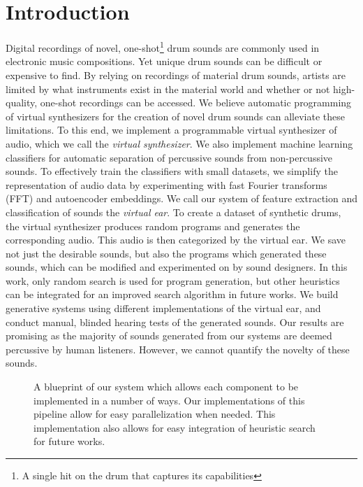 \documentclass[runningheads,a4paper]{llncs}
\begin{document}
\section{Introduction} 
Digital recordings of novel, one-shot\footnote{A single hit on the drum that captures its capabilities} drum sounds are commonly used in  electronic music compositions. Yet unique drum sounds can be difficult or expensive to find. By relying on recordings of material drum sounds, artists are limited by what instruments exist in the material world and whether or not high-quality, one-shot recordings can be accessed. We believe automatic programming of virtual synthesizers for the creation of novel drum sounds can alleviate these limitations. To this end, we implement a programmable virtual synthesizer of audio, which we call the \emph{virtual synthesizer}. We also implement machine learning classifiers for automatic separation of percussive sounds from non-percussive sounds. To effectively train the classifiers with small datasets, we simplify the representation of audio data by experimenting with fast Fourier transforms (FFT) and autoencoder embeddings. We call our system of feature extraction and classification of sounds the \emph{virtual ear}. To create a dataset of synthetic drums, the virtual synthesizer produces random programs and generates the corresponding audio. This audio is then categorized by the virtual ear. We save not just the desirable sounds, but also the programs which generated these sounds, which can be modified and experimented on by sound designers. In this work, only random search is used for program generation, but other heuristics can be integrated for an improved search algorithm in future works. We build generative systems using different implementations of the virtual ear, and conduct manual, blinded hearing tests of the generated sounds. Our results are promising as the majority of sounds generated from our systems are deemed percussive by human listeners. However, we cannot quantify the novelty of these sounds. 
 \begin{figure}[tbp]
    \begin{center}
    \end{center}
    \caption{A blueprint of our system which allows each component to be implemented in a number of ways. Our implementations of this pipeline allow for easy parallelization when needed. This implementation also allows for easy integration of heuristic search for future works. 
    }
\label{fig:pipeline_outline}
\end{figure}
\end{document}
